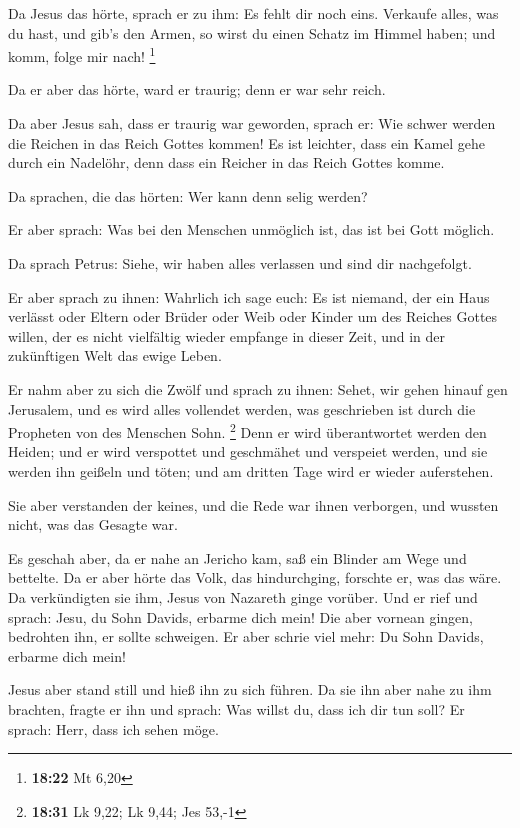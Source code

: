  Da Jesus das hörte, sprach er zu ihm: Es fehlt dir noch
eins. Verkaufe alles, was du hast, und gib's den Armen, so wirst du
einen Schatz im Himmel haben; und komm, folge mir nach! \footnote{\textbf{18:22}
  Mt 6,20}

 Da er aber das hörte, ward er traurig; denn er war sehr
reich.

 Da aber Jesus sah, dass er traurig war geworden, sprach
er: Wie schwer werden die Reichen in das Reich Gottes kommen!
 Es ist leichter, dass ein Kamel gehe durch ein Nadelöhr,
denn dass ein Reicher in das Reich Gottes komme.

 Da sprachen, die das hörten: Wer kann denn selig werden?

 Er aber sprach: Was bei den Menschen unmöglich ist, das
ist bei Gott möglich.

 Da sprach Petrus: Siehe, wir haben alles verlassen und
sind dir nachgefolgt.

 Er aber sprach zu ihnen: Wahrlich ich sage euch: Es ist
niemand, der ein Haus verlässt oder Eltern oder Brüder oder Weib oder
Kinder um des Reiches Gottes willen,  der es nicht
vielfältig wieder empfange in dieser Zeit, und in der zukünftigen Welt
das ewige Leben.

 Er nahm aber zu sich die Zwölf und sprach zu ihnen: Sehet,
wir gehen hinauf gen Jerusalem, und es wird alles vollendet werden, was
geschrieben ist durch die Propheten von des Menschen Sohn. \footnote{\textbf{18:31}
  Lk 9,22; Lk 9,44; Jes 53,-1}  Denn er wird überantwortet
werden den Heiden; und er wird verspottet und geschmähet und verspeiet
werden,  und sie werden ihn geißeln und töten; und am
dritten Tage wird er wieder auferstehen.

 Sie aber verstanden der keines, und die Rede war ihnen
verborgen, und wussten nicht, was das Gesagte war.

 Es geschah aber, da er nahe an Jericho kam, saß ein
Blinder am Wege und bettelte.  Da er aber hörte das Volk,
das hindurchging, forschte er, was das wäre.  Da
verkündigten sie ihm, Jesus von Nazareth ginge vorüber. 
Und er rief und sprach: Jesu, du Sohn Davids, erbarme dich mein!
 Die aber vornean gingen, bedrohten ihn, er sollte
schweigen. Er aber schrie viel mehr: Du Sohn Davids, erbarme dich mein!

 Jesus aber stand still und hieß ihn zu sich führen. Da sie
ihn aber nahe zu ihm brachten, fragte er ihn  und sprach:
Was willst du, dass ich dir tun soll? Er sprach: Herr, dass ich sehen
möge.

